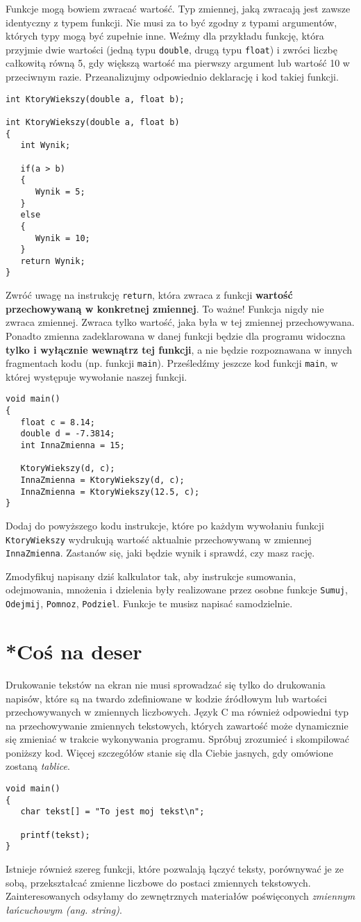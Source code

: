 \documentclass{instrukcja}
\begin{document}
Funkcje mogą bowiem zwracać wartość. Typ zmiennej, jaką zwracają jest zawsze identyczny z typem funkcji. Nie musi za to być zgodny z typami argumentów, których typy mogą być zupełnie inne. Weźmy dla przykładu funkcję, która przyjmie dwie wartości (jedną typu {\tt double}, drugą typu {\tt float}) i zwróci liczbę całkowitą równą 5, gdy większą wartość ma pierwszy argument lub wartość 10 w przeciwnym razie. Przeanalizujmy odpowiednio deklarację i kod takiej funkcji.
\begin{verbatim}
int KtoryWiekszy(double a, float b);

int KtoryWiekszy(double a, float b)
{
   int Wynik;

   if(a > b)
   {
      Wynik = 5;
   }
   else
   {
      Wynik = 10;
   }
   return Wynik;
}
\end{verbatim}
Zwróć uwagę na instrukcję {\tt return}, która zwraca z funkcji {\bf wartość przechowywaną w konkretnej zmiennej}. To ważne! Funkcja nigdy nie zwraca zmiennej. Zwraca tylko wartość, jaka była w tej zmiennej przechowywana. Ponadto zmienna zadeklarowana w danej funkcji będzie dla programu widoczna {\bf tylko i wyłącznie wewnątrz tej funkcji}, a nie będzie rozpoznawana w innych fragmentach kodu (np. funkcji {\tt main}). Prześledźmy jeszcze kod funkcji {\tt main}, w której występuje wywołanie naszej funkcji.
\begin{verbatim}
void main()
{
   float c = 8.14;
   double d = -7.3814;
   int InnaZmienna = 15;
   
   KtoryWiekszy(d, c);
   InnaZmienna = KtoryWiekszy(d, c);
   InnaZmienna = KtoryWiekszy(12.5, c);
}
\end{verbatim}
Dodaj do powyższego kodu instrukcje, które po każdym wywołaniu funkcji {\tt KtoryWiekszy} wydrukują wartość aktualnie przechowywaną w zmiennej {\tt InnaZmienna}. Zastanów się, jaki będzie wynik i sprawdź, czy masz rację.

Zmodyfikuj napisany dziś kalkulator tak, aby instrukcje sumowania, odejmowania, mnożenia i dzielenia były realizowane przez osobne funkcje {\tt Sumuj}, {\tt Odejmij}, {\tt Pomnoz}, {\tt Podziel}. Funkcje te musisz napisać samodzielnie.

\section{*Coś na deser}
Drukowanie tekstów na ekran nie musi sprowadzać się tylko do drukowania napisów, które są na twardo zdefiniowane w kodzie źródłowym lub wartości przechowywanych w zmiennych liczbowych. Język C ma również odpowiedni typ na przechowywanie zmiennych tekstowych, których zawartość może dynamicznie się zmieniać w trakcie wykonywania programu. Spróbuj zrozumieć i skompilować poniższy kod. Więcej szczegółów stanie się dla Ciebie jasnych, gdy omówione zostaną {\it tablice}.
\begin{verbatim}
void main()
{
   char tekst[] = "To jest moj tekst\n";

   printf(tekst);
}
\end{verbatim}
Istnieje również szereg funkcji, które pozwalają łączyć teksty, porównywać je ze sobą, przekształcać zmienne liczbowe do postaci zmiennych tekstowych. Zainteresowanych odsyłamy do zewnętrznych materiałów poświęconych {\it zmiennym łańcuchowym (ang. string)}.
\end{document}
